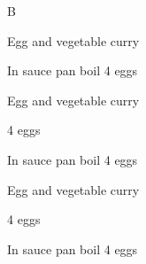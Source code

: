 \begin{menu}{B}
\begin{recipe}{2}{Egg and vegetable curry}
    \begin{instructions}
    \item 
        In sauce pan boil
        4   eggs
    \end{instructions}
    \end{recipe}%
  
    \begin{recipe}{2}{Egg and vegetable curry}%
    
		\begin{ingredients}
		4  eggs  \\
	
		\end{ingredients}
	
    \begin{instructions}
    \item 
        In sauce pan boil
        4   eggs
    \end{instructions}
    \end{recipe}%
  
    \begin{recipe}{2}{Egg and vegetable curry}%
    
		\begin{ingredients}
		4  eggs  \\
	
		\end{ingredients}
	
    \begin{instructions}
    \item 
        In sauce pan boil
        4   eggs
    \end{instructions}
    \end{recipe}%
  
    \clearpage
    \end{menu}
	
	